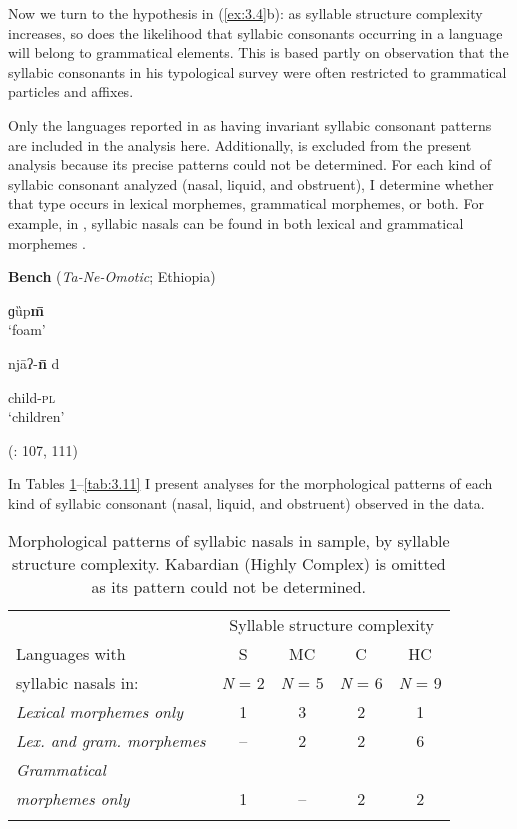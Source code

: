   Now we turn to the hypothesis in (\ref{ex:3.4}b): as syllable structure complexity increases, so does the likelihood that syllabic consonants occurring in a language will belong to grammatical elements. This is based partly on  observation that the syllabic consonants in his typological survey were often restricted to grammatical particles and affixes.

  Only the languages reported in  as having invariant syllabic consonant patterns are included in the analysis here. Additionally,  is excluded from the present analysis because its precise patterns could not be determined. For each kind of syllabic consonant analyzed (nasal, liquid, and obstruent), I determine whether that type occurs in lexical morphemes, grammatical morphemes, or both. For example, in , syllabic nasals can be found in both lexical and grammatical morphemes .

\ea\label{ex:3.25}
  \textbf{Bench} (\textit{Ta-Ne-Omotic}; Ethiopia)

\ea   ɡȕp\textbf{m\={} }\\
\glt ‘foam’

\ex   njāʔ-\textbf{n\={} }d

child-\textsc{pl}\\
\glt ‘children’

(\citealt{Rapold2006}: 107, 111)
\z
\z

  In Tables \ref{tab:3.9}--\ref{tab:3.11} I present analyses for the morphological patterns of each kind of syllabic consonant (nasal, liquid, and obstruent) observed in the data.

\begin{table}
\begin{tabular}{lcccc}
\lsptoprule
 & \multicolumn{4}{c}{Syllable structure complexity}\\\cmidrule(lr){2-5}
Languages with & S & MC & C & HC\\
syllabic nasals in: & \textit{N} = 2 & \textit{N} = 5 & \textit{N} = 6 & \textit{N} = 9\\\midrule
 \textit{Lexical morphemes only} & 1 & 3 & 2 & 1\\
 \textit{Lex. and gram. morphemes} & -- & 2 & 2 & 6\\
 \textit{Grammatical} \\
\textit{morphemes only} & 1 & -- & 2 & 2\\
\lspbottomrule
\end{tabular}
\caption{\label{tab:3.9}Morphological patterns of syllabic nasals in sample, by syllable structure complexity. Kabardian (Highly Complex) is omitted as its pattern could not be determined.}
\end{table}




